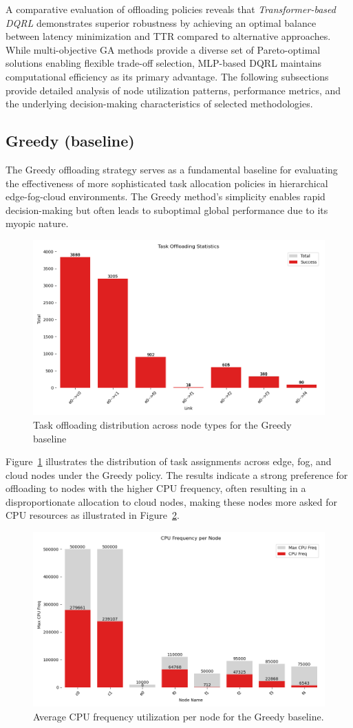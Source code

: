 \documentclass[preprint,12pt]{elsarticle}
\begin{document}
A comparative evaluation of offloading policies reveals that \emph{Transformer-based DQRL} demonstrates superior robustness by achieving an optimal balance between latency minimization and TTR compared to alternative approaches. While multi-objective GA methods provide a diverse set of Pareto-optimal solutions enabling flexible trade-off selection, MLP-based DQRL maintains computational efficiency as its primary advantage. The following subsections provide detailed analysis of node utilization patterns, performance metrics, and the underlying decision-making characteristics of selected methodologies.

\subsection{Greedy (baseline)}
\label{subsec:greedy-baseline}

The Greedy offloading strategy serves as a fundamental baseline for evaluating the effectiveness of more sophisticated task allocation policies in hierarchical edge-fog-cloud environments. The Greedy method's simplicity enables rapid decision-making but often leads to suboptimal global performance due to its myopic nature. 


\begin{figure}[H]
    \centering
    \includegraphics[width=0.5\linewidth]{figs/greedy-task-offloading-stats.png}
    \caption{Task offloading distribution across node types for the Greedy baseline}
    \label{fig:greedy-task-offloading-stats}
\end{figure}

Figure~\ref{fig:greedy-task-offloading-stats} illustrates the distribution of task assignments across edge, fog, and cloud nodes under the Greedy policy. The results indicate a strong preference for offloading to nodes with the higher CPU frequency, often resulting in a disproportionate allocation to cloud nodes, making these nodes more asked for CPU resources as illustrated in Figure~\ref{fig:greedy-cpu-freq}.



\begin{figure}[H]
    \centering
    \includegraphics[width=0.5\linewidth]{figs/greedy_cpu_frequency_per_node.png}
    \caption{Average CPU frequency utilization per node for the Greedy baseline.}
    \label{fig:greedy-cpu-freq}
\end{figure}
\end{document}
